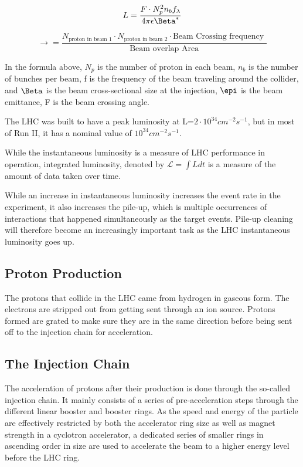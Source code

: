 \begin{equation}
L = \frac{F \cdot N^{2}_{p} n_{b} f_{\lambda}}{4\pi\epsilon \Beta^{*}}
\end{equation}


\begin{equation}
    \rightarrow = \frac{N_{\textrm{proton in beam 1}} \cdot N_{\textrm{proton in beam 2}} \cdot \textrm{Beam Crossing frequency }}{\textrm{Beam overlap Area}}
\end{equation}

In the formula above, $N_p$ is the number of proton in each beam, $n_{b}$ is the number of bunches per beam, f is the frequency of the beam traveling around the collider, and $\Beta^{\*}$ is the beam cross-sectional size at the injection, $\epi$ is the beam emittance, F is the beam crossing angle.

The LHC was built to have a peak luminosity at L=$2 \cdot 10^{34}cm^{-2}s^{-1}$, but in most of Run II, it has a nominal value of $10^{34}cm^{-2}s^{-1}$.

While the instantaneous luminosity is a measure of LHC performance in operation, integrated luminosity, denoted by $\mathcal{L} = \int L dt$ is a measure of the amount of data taken over time.

While an increase in instantaneous luminosity increases the event rate in the experiment, it also increases the pile-up, which is multiple occurrences of interactions that happened simultaneously as the target events. Pile-up cleaning will therefore become an increasingly important task as the LHC instantaneous luminosity goes up.

\subsection{Proton Production}
The protons that collide in the LHC came from hydrogen in gaseous form. The electrons are stripped out from getting sent through an ion source. Protons formed are grated to make sure they are in the same direction before being sent off to the injection chain for acceleration. 

\subsection{The Injection Chain}
The acceleration of protons after their production is done through the so-called injection chain. It mainly consists of a series of pre-acceleration steps through the different linear booster and booster rings. As the speed and energy of the particle are effectively restricted by both the accelerator ring size as well as magnet strength in a cyclotron accelerator, a dedicated series of smaller rings in ascending order in size are used to accelerate the beam to a higher energy level before the LHC ring.

